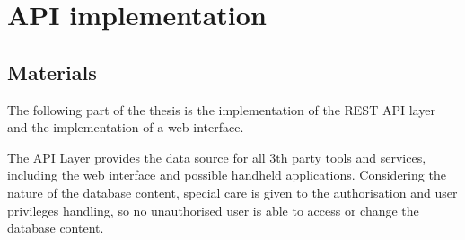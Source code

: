 \chapter{API implementation}
\label{chap:apiImplementation}
\section{Materials}
\par The following part of the thesis is the implementation of the REST API layer and the implementation of a web interface.
	
\par The API Layer provides the data source for all 3th party tools and services, including the web interface and possible handheld applications. Considering the nature of the database content, special care is given to the authorisation and user privileges handling, so no unauthorised user is able to access or change the database content.